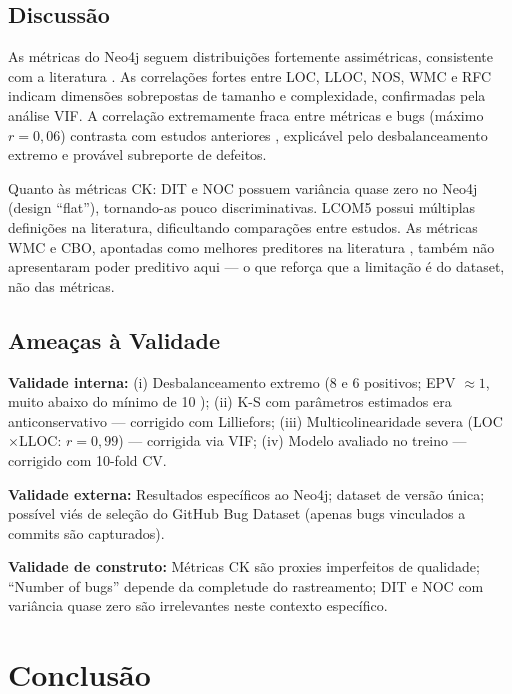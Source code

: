 \documentclass[12pt]{article}
\begin{document}
\subsection{Discussão}

As métricas do Neo4j seguem distribuições fortemente assimétricas, consistente com a literatura \cite{radjenovic2013, gyimothy2005}. As correlações fortes entre LOC, LLOC, NOS, WMC e RFC indicam dimensões sobrepostas de tamanho e complexidade, confirmadas pela análise VIF. A correlação extremamente fraca entre métricas e bugs (máximo $r = 0{,}06$) contrasta com estudos anteriores \cite{basili1996, gyimothy2005}, explicável pelo desbalanceamento extremo e provável subreporte de defeitos.

Quanto às métricas CK: DIT e NOC possuem variância quase zero no Neo4j (design ``flat''), tornando-as pouco discriminativas. LCOM5 possui múltiplas definições na literatura, dificultando comparações entre estudos. As métricas WMC e CBO, apontadas como melhores preditores na literatura \cite{radjenovic2013}, também não apresentaram poder preditivo aqui --- o que reforça que a limitação é do dataset, não das métricas.

\subsection{Ameaças à Validade} \label{sec:ameacas}

\textbf{Validade interna:} (i) Desbalanceamento extremo (8 e 6 positivos; EPV $\approx 1$, muito abaixo do mínimo de 10 \cite{hosmer2013}); (ii) K-S com parâmetros estimados era anticonservativo --- corrigido com Lilliefors; (iii) Multicolinearidade severa (LOC$\times$LLOC: $r = 0{,}99$) --- corrigida via VIF; (iv) Modelo avaliado no treino --- corrigido com 10-fold CV.

\textbf{Validade externa:} Resultados específicos ao Neo4j; dataset de versão única; possível viés de seleção do GitHub Bug Dataset (apenas bugs vinculados a commits são capturados).

\textbf{Validade de construto:} Métricas CK são proxies imperfeitos de qualidade; ``Number of bugs'' depende da completude do rastreamento; DIT e NOC com variância quase zero são irrelevantes neste contexto específico.

\section{Conclusão} \label{sec:conclusao}
\end{document}
